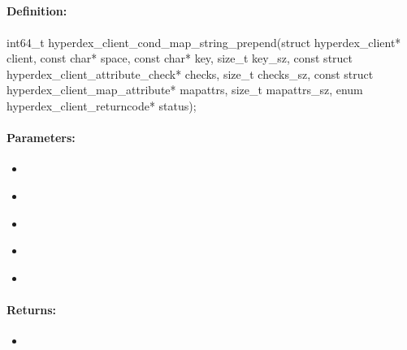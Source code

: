 \pagebreak
\subsection{}
\label{api:c:cond_map_string_prepend}


\paragraph{Definition:}
\begin{ccode}
int64_t hyperdex_client_cond_map_string_prepend(struct hyperdex_client* client,
        const char* space,
        const char* key, size_t key_sz,
        const struct hyperdex_client_attribute_check* checks, size_t checks_sz,
        const struct hyperdex_client_map_attribute* mapattrs, size_t mapattrs_sz,
        enum hyperdex_client_returncode* status);
\end{ccode}

\paragraph{Parameters:}
\begin{itemize}[noitemsep]
\item {}\\

\item {}\\

\item {}\\

\item {}\\

\item {}\\

\end{itemize}

\paragraph{Returns:}
\begin{itemize}[noitemsep]
\item {}\\

\end{itemize}

